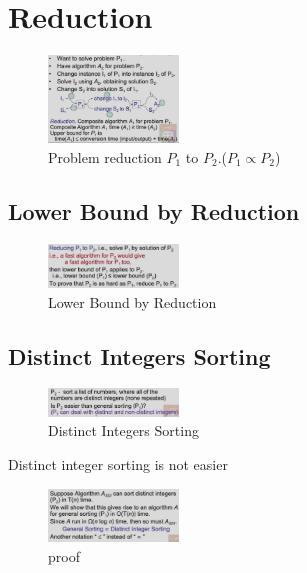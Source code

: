 \newpage
\section{Reduction}


\begin{figure}[H]
    \centering
    \includegraphics[width=0.309\textwidth]{pic/DAA6/Problem reduction}
    \caption{Problem reduction $P_1$ to $P_2$.($P_1\propto P_2$)}
\end{figure}

\subsection{Lower Bound by Reduction}
\begin{figure}[H]
    \centering
    \includegraphics[width=0.309\textwidth]{pic/DAA6/Lower Bound by Reduction}
    \caption{Lower Bound by Reduction}
\end{figure}


\subsection{Distinct Integers Sorting}
\begin{figure}[H]
    \centering
    \includegraphics[width=0.309\textwidth]{pic/DAA6/Distinct Integers Sorting1}
    \caption{Distinct Integers Sorting}
\end{figure}

\begin{theorem}
    Distinct integer sorting is not easier
\end{theorem}

\begin{figure}[H]
    \centering
    \includegraphics[width=0.309\textwidth]{pic/DAA6/proof}
    \caption{proof}
\end{figure}

